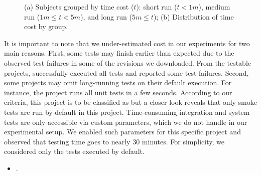 \begin{figure}[ht]
\begin{subfigure}{0.25\textwidth}
        \caption{\label{fig:rq1-boxplot}}
    \end{subfigure}%
    \caption{(a) Subjects grouped by time cost ($t$): short run ($t <
    1m$), medium run ($1m \le t < 5m$), and long run ($5m \le t$); (b)
    Distribution of time cost by group.}
\end{figure}


It is important to note that we under-estimated cost in our
experiments for two main reasons.  First, some tests may finish
earlier than expected due to the observed test failures in some of the
revisions we downloaded.  From the \numSubjs{} testable projects,
\numSubjsPass{} successfully executed all tests and \numSubjsFail{}
reported some test failures.  Second, some projects may omit
long-running tests on their default execution. For instance, the
project  runs all unit tests in a few
seconds.  According to our criteria, this project is to be classified
as \shortg{} but a closer look reveals that only smoke tests are run
by default in this project.  Time-consuming integration and system
tests are only accessible via custom parameters, which we do not
handle in our experimental setup.  We enabled such parameters for this
specific project and observed that testing time goes to nearly 30
minutes.  For simplicity, we considered only the tests executed by
default.

\vspace{1ex}
\begin{center}
\end{center}
\vspace{1ex}


\begin{itemize}
    \item \numRQFeasibilityTwo. \textbf{\RQFeasibilityTwo}
\end{itemize}

